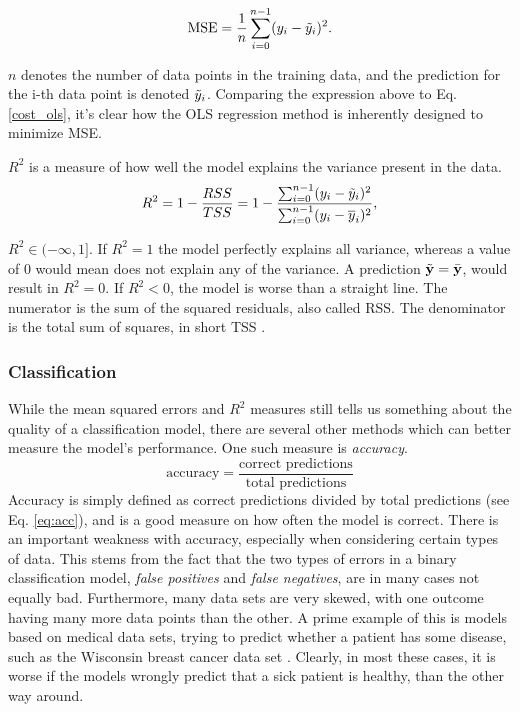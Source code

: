 \begin{equation}\label{mse}
    \text{MSE} = \frac{1}{n}\sum_{i=0}^{n-1}(y_i-\Tilde{y}_i)^2.
\end{equation}

$n$ denotes the number of data points in the training data, and the prediction for the i-th data point is denoted $\Tilde{y}_i$. Comparing the expression above to Eq. \ref{cost_ols}, it's clear how the OLS regression method is inherently designed to minimize MSE. 

$R^2$ is a measure of how well the model explains the variance present in the data. 
\begin{equation}
    R^2 = 1 - \frac{RSS}{TSS}= 1 - \frac{\sum_{i=0}^{n-1}(y_i-\Tilde{y}_i)^2}{\sum_{i=0}^{n-1}(y_i-\overline{y}_i)^2},
\end{equation}

$R^2 \in (-\infty,1]$. If $R^2 = 1$ the model perfectly explains all variance, whereas a value of 0 would mean does not explain any of the variance. 
A prediction $\tilde {\mathbf{y}} = \bar {\mathbf{y}}$, would result in $R^2 = 0$.
If $R^2<0$, the model is worse than a straight line.
The numerator is the sum of the squared residuals, also called RSS. The denominator is the total sum of squares, in short TSS \cite[p. 29]{martin}.

\subsubsection{Classification}
While the mean squared errors and $R^2$ measures still tells us something about the quality of a classification model, there are several other methods which can better measure the model's performance.
One such measure is \textit{accuracy}.
\begin{equation}\label{eq:acc}
    \text{accuracy} = \frac{\text{correct predictions}}{\text{total predictions}}
\end{equation}
Accuracy is simply defined as correct predictions divided by total predictions (see Eq. \ref{eq:acc}), and is a good measure on how often the model is correct.
There is an important weakness with accuracy, especially when considering certain types of data.
This stems from the fact that the two types of errors in a binary classification model, \textit{false positives} and \textit{false negatives}, are in many cases not equally bad.
Furthermore, many data sets are very skewed, with one outcome having many more data points than the other.
A prime example of this is models based on medical data sets, trying to predict whether a patient has some disease, such as the Wisconsin breast cancer data set \cite{breast_cancer_wisconsin}.
Clearly, in most these cases, it is worse if the models wrongly predict that a sick patient is healthy, than the other way around.

